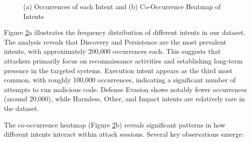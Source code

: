 \begin{figure}[h]
\begin{subfigure}[c]{0.47\textwidth}
                \label{fig:co-occurrence-heatmap-of-intents}
            \end{subfigure}
            \vspace{-0.5cm}
            \caption{(a) Occurrences of each Intent and (b) Co-Occurrence Heatmap of Intents}
            \label{fig:occurrences-and-co-occurrences-intents}
        \end{figure}

        Figure \ref{fig:occurrences-and-co-occurrences-intents}a illustrates the frequency distribution of different intents in our dataset. The analysis reveals that Discovery and Persistence are the most prevalent intents, with approximately 200,000 occurrences each. This suggests that attackers primarily focus on reconnaissance activities and establishing long-term presence in the targeted systems. Execution intent appears as the third most common, with roughly 100,000 occurrences, indicating a significant number of attempts to run malicious code. Defense Evasion shows notably fewer occurrences (around 20,000), while Harmless, Other, and Impact intents are relatively rare in the dataset.

        The co-occurrence heatmap (Figure \ref{fig:occurrences-and-co-occurrences-intents}b) reveals significant patterns in how different intents interact within attack sessions. Several key observations emerge:

